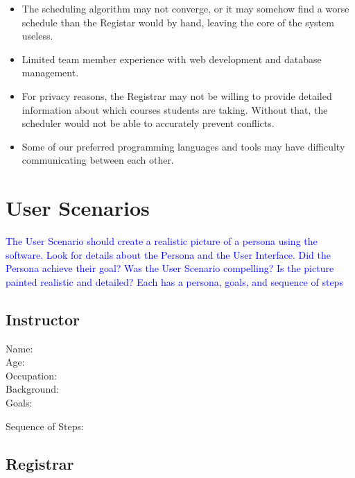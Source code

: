 \documentclass[11pt]{article}
\begin{document}
\begin{itemize}
\item The scheduling algorithm may not converge, or it may somehow find a worse schedule than the Registar would by hand, leaving the core of the system useless.
\item Limited team member experience with web development and database management.
\item For privacy reasons, the Registrar may not be willing to provide detailed information about which courses students are taking. Without that, the scheduler would not be able to accurately prevent conflicts.
\item Some of our preferred programming languages and tools may have difficulty communicating between each other. %
\end{itemize}


\section{User Scenarios}  %
\textcolor{blue}{The User Scenario should create a realistic picture of a persona using the software.
Look for details about the Persona and the User Interface.
Did the Persona achieve their goal?
Was the User Scenario compelling?
Is the picture painted realistic and detailed?
Each has a persona, goals, and sequence of steps}
\subsection{Instructor} %
\begin{description}
\item[Name:]
\item[Age:]
\item[Occupation:]
\item[Background:]

\item[Goals:]
\begin{enumerate}
\end{enumerate}

\item[Sequence of Steps:]
\end{description}


\subsection{Registrar}  %
\end{document}
